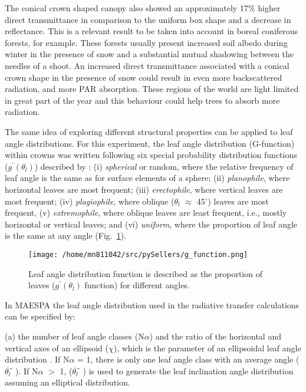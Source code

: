 The conical crown shaped canopy also showed an approximately 17\% higher direct transmittance in comparison to the uniform box shape and a decrease in reflectance. This is a relevant result to be taken into account in boreal coniferous forests, for example. These forests usually present increased soil albedo during winter in the presence of snow and a substantial mutual shadowing between the needles of a shoot. An increased direct transmittance associated with a conical crown shape in the presence of snow could result in even more backscattered radiation, and more PAR absorption. These regions of the world are light limited in great part of the year and this behaviour could help trees to absorb more radiation.  
  
The same idea of exploring different structural properties can be applied to leaf angle distributions. For this experiment, the leaf angle distribution (G-function) within crowns was written following six special probability distribution functions ($g^{\prime}(\theta_l)$)  described by \citet{deWit1965}: (i) \textit{spherical} or random, where the relative frequency of leaf angle is the same as for surface elements of a sphere; (ii) \textit{planophile}, where horizontal leaves are most frequent; (iii) \textit{erectophile}, where vertical leaves are most frequent; (iv) \textit{plagiophile}, where oblique ($\theta_l$ $\approx$ 45$^{\circ}$) leaves are most frequent, (v) \textit{extremophile}, where oblique leaves are least frequent, i.e., mostly horizontal or vertical leaves; and (vi) \textit{uniform}, where the proportion of leaf angle is the same at any angle (Fig.~\ref{f:g_function}). 

\begin{figure}[ht]
      	\centering
        \texttt{[image: /home/mn811042/src/pySellers/g\_function.png]}
        \caption{Leaf angle distribution function is described as the proportion of leaves ($g^{\prime}(\theta_l)$ function) for different angles.} 
\label{f:g_function}
\end{figure}

In MAESPA the leaf angle distribution used in the radiative transfer calculations can be specified by:

(a) the number of leaf angle classes (N$\alpha$) and the ratio of the horizontal and vertical axes of an ellipsoid ($\chi$), which is the parameter of an ellipsoidal leaf angle distribution \citep{Campbell1990}. If N$\alpha$ = 1, there is only one leaf angle class with an average angle ($\overline{\theta_l}̅$). If N$\alpha$ $>$ 1, ($\overline{\theta_l}̅$) is used to generate the leaf inclination angle distribution assuming an elliptical distribution.

